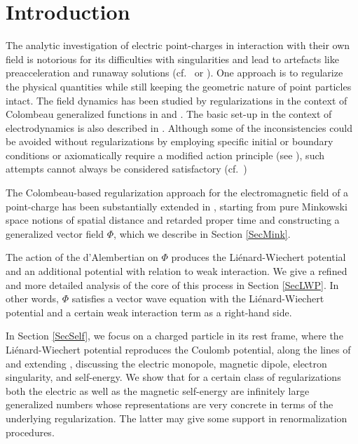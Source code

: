 \documentclass[sumlimits,intlimits,namelimits%
]{amsart}
\theoremstyle{definition}
\begin{document}
%
%
%
%
%





\section{Introduction}

The analytic investigation of electric point-charges in interaction with their own field is notorious for its difficulties with singularities and lead to artefacts like preacceleration and runaway solutions (cf.\ \cite[Sections 4.3 and 5.5]{Parrott} or \cite[Section 8.4]{Thirring:01}). One approach is to regularize the physical quantities while still keeping the geometric nature of point particles intact.  The field dynamics has been studied by regularizations in the context of Colombeau generalized functions in \cite{HK:98} and \cite{HK:00}. The basic set-up in the context of electrodynamics is also described in \cite{GsponerCTED}. Although some of the inconsistencies could be avoided without regularizations by employing specific initial or boundary conditions or axiomatically require a modified action principle (see \cite[Chapter 6]{Rohrlich}), such attempts cannot always be considered satisfactory (cf.\ \cite[Remark (8.4.21)]{Thirring:01})

The Colombeau-based regularization approach for the electromagnetic field of a point-charge has been substantially extended in \cite{GEW}, starting from pure Minkowski space notions of spatial distance and retarded proper time and constructing a generalized vector field $\Phi$, which we describe in Section \ref{SecMink}. 

The action of the d'Alembertian on $\Phi$ produces the Li\'{e}nard-Wiechert potential and an additional potential with relation to weak interaction. We give a refined and more detailed analysis of the core of this process in Section \ref{SecLWP}. In other words, $\Phi$ satisfies a vector wave equation with the Li\'{e}nard-Wiechert potential and a certain weak interaction term as a right-hand side.

 
In Section \ref{SecSelf}, we focus on a charged particle in its rest frame, where the Li\'{e}nard-Wiechert potential reproduces the Coulomb potential, along the lines of and extending \cite{GsponerJMP}, discussing the electric monopole, magnetic dipole, electron singularity, and self-energy. We show that for a certain class of regularizations both the electric as well as the magnetic self-energy are infinitely large generalized numbers whose representations are very concrete in terms of the underlying regularization. The latter may give some support in renormalization procedures.
\end{document}
